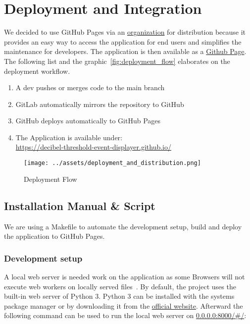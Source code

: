 \section{Deployment and Integration}\label{sec:deployment-and-integration}
We decided to use GitHub Pages via an \href{https://github.com/decibel-threshold-event-displayer}{organization} for distribution because it provides an easy way to access the
application for end users and simplifies the maintenance for developers. The application is then available as a \href{https://decibel-threshold-event-displayer.github.io/}{Github Page}.
The following list and the graphic~\autoref{fig:deployment_flow} elaborates on the deployment workflow.

\begin{enumerate}
    \item A dev pushes or merges code to the main branch
    \item GitLab automatically mirrors the repository to GitHub
    \item GitHub deploys automatically to GitHub Pages
    \item {The Application is available under: \\
          \href{https://decibel-threshold-event-displayer.github.io/}{https://decibel-threshold-event-displayer.github.io/}}
\end{enumerate}

\begin{figure}[H]
    \centering
    \texttt{[image: ../assets/deployment\_and\_distribution.png]}
    \caption{Deployment Flow}\label{fig:deployment_flow}
\end{figure}

\subsection{Installation Manual \& Script}\label{subsec:installation-manuel-and-script}
We are using a Makefile to automate the development setup, build and deploy the application to GitHub Pages.

\subsubsection{Development setup}\label{subsubsec:deployment-setup}
A local web server is needed work on the application as some Browsers will not execute web workers on locally served files~\cite{stackoverflow_chrome_cant_load_web_worker}.
By default, the project uses the built-in web server of Python 3.
Python 3 can be installed with the systems package manager or by downloading it from the \href{https://www.python.org/downloads/}{official website}.
Afterward the following command can be used to run the local web server on \href{http://0.0.0.0:8000/}{0.0.0.0:8000/\#/}:


